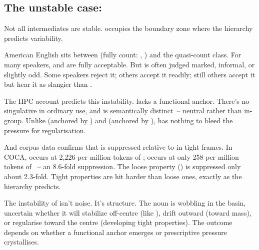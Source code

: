 \subsection{The unstable case: }
\label{sec:9:folks}

Not all intermediates are stable.  occupies the boundary zone where the hierarchy predicts variability.

American English  sits between  (fully count: , ) and the quasi-count class. For many speakers,  and  are fully acceptable. But  is often judged marked, informal, or slightly odd. Some speakers reject it; others accept it readily; still others accept it but hear it as slangier than .

The HPC account predicts this instability.  lacks a functional anchor. There's no singulative \ungram{} in ordinary use, and  is semantically distinct~-- neutral rather than in-group. Unlike  (anchored by ) and  (anchored by ),  has nothing to bleed the pressure for regularisation.

And corpus data confirms that  is suppressed relative to  in tight frames. In COCA,  occurs at 2,226 per million tokens of ;  occurs at only 258 per million tokens of ~-- an 8.6-fold suppression. The loose property () is suppressed only about 2.3-fold. Tight properties are hit harder than loose ones, exactly as the hierarchy predicts.

The instability of  isn't noise. It's structure. The noun is wobbling in the basin, uncertain whether it will stabilize off-centre (like ), drift outward (toward mass), or regularise toward the centre (developing tight properties). The outcome depends on whether a functional anchor emerges or prescriptive pressure crystallises.

